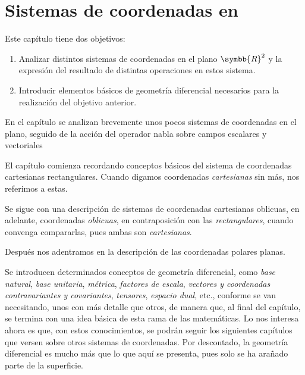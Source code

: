%

\chapter{Sistemas de coordenadas en
  }
Este capítulo tiene dos objetivos:
\begin{enumerate}
\item Analizar distintos sistemas de coordenadas en el plano $\symbb{R}^2$ y la expresión
  del resultado de distintas operaciones en estos sistema.
\item Introducir elementos básicos de geometría diferencial necesarios para la
  realización del objetivo anterior.
\end{enumerate}

En el capítulo se analizan brevemente unos pocos sistemas de coordenadas en el plano,
seguido de la acción del operador nabla sobre campos escalares y vectoriales

El capítulo comienza recordando conceptos básicos del sistema de coordenadas cartesianas
rectangulares. Cuando digamos coordenadas \emph{cartesianas} sin más, nos referimos a
estas.

Se sigue con una descripción de sistemas de coordenadas cartesianas oblicuas, en adelante, coordenadas \emph{oblicuas}, en contraposición con las \emph{rectangulares},
cuando convenga compararlas, pues ambas son \emph{cartesianas}.

Después nos adentramos en la descripción de las coordenadas polares planas.

Se introducen determinados conceptos de geometría diferencial, como \emph{base natural},
\emph{base unitaria}, \emph{métrica}, \emph{factores de escala},
\emph{vectores y coordenadas contravariantes y covariantes}, \emph{tensores},
\emph{espacio dual}, etc., conforme se van necesitando, unos con más detalle que otros,
de manera que, al final del capítulo, se termina con una idea básica de esta rama de las
matemáticas. Lo nos interesa ahora es que, con estos conocimientos, se podrán seguir los
siguientes capítulos que versen sobre otros sistemas de coordenadas. Por descontado, la
geometría diferencial es mucho más que lo que aquí se presenta, pues solo se ha arañado
parte de la superficie.


